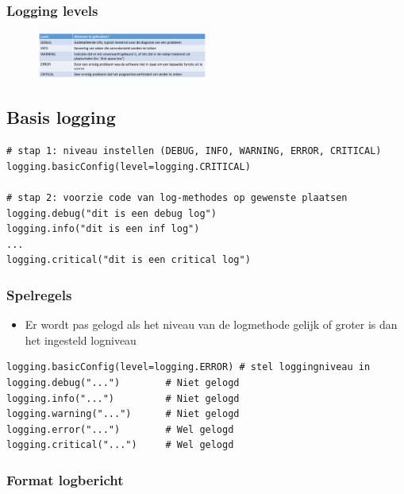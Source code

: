 \documentclass{article}
\begin{document}
\subsubsection{Logging levels}

\begin{figure}[H]
    \centering
    \includegraphics[width=0.5\textwidth]{logging-levels.png}
\end{figure}

\subsection{Basis logging}

\begin{verbatim}
# stap 1: niveau instellen (DEBUG, INFO, WARNING, ERROR, CRITICAL)
logging.basicConfig(level=logging.CRITICAL)

# stap 2: voorzie code van log-methodes op gewenste plaatsen
logging.debug("dit is een debug log")
logging.info("dit is een inf log")
...
logging.critical("dit is een critical log")
\end{verbatim}

\subsubsection{Spelregels}

\begin{itemize}
    \item Er wordt pas gelogd als het niveau van de logmethode gelijk of groter is dan het ingesteld logniveau
\end{itemize}

\begin{verbatim}
logging.basicConfig(level=logging.ERROR) # stel loggingniveau in
logging.debug("...")        # Niet gelogd
logging.info("...")         # Niet gelogd
logging.warning("...")      # Niet gelogd
logging.error("...")        # Wel gelogd
logging.critical("...")     # Wel gelogd
\end{verbatim}

\subsubsection{Format logbericht}
\end{document}
